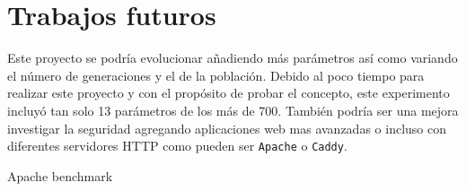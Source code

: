 \section{Trabajos futuros}
Este proyecto se podría evolucionar añadiendo más parámetros así como variando el número de generaciones y el de la población. Debido al poco tiempo para realizar este proyecto y con el propósito de probar el concepto, este experimento incluyó tan solo 13 parámetros de los más de 700. También podría ser una mejora investigar la seguridad agregando aplicaciones web mas avanzadas o incluso con diferentes servidores HTTP como pueden ser  \texttt{Apache} o \texttt{Caddy}.

\bigskip
Apache benchmark
